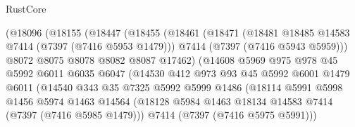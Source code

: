 \begin{lexlean}{RustCore}
\begin{coremodule}
                          (@18096
                            (@18155
                              (@18447
                                (@18455
                                  (@18461
                                    (@18471
                                      (@18481 @18485 @14583 @7414 (@7397 (@7416 @5953 @1479)))
                                      @7414
                                      (@7397 (@7416 @5943 @5959)))
                                    @8072
                                    @8075
                                    @8078
                                    @8082
                                    @8087
                                    @17462)
                                  (@14608
                                    @5969
                                    @975
                                    @978
                                    @45
                                    @5992
                                    @6011
                                    @6035
                                    @6047
                                    (@14530
                                      @412
                                      @973
                                      @93
                                      @45
                                      @5992
                                      @6001
                                      @1479
                                      @6011
                                      (@14540
                                        @343
                                        @35
                                        @7325
                                        @5992
                                        @5999
                                        @1486
                                        (@18114
                                          @5991
                                          @5998
                                          @1456
                                          @5974
                                          @1463
                                          @14564
                                          (@18128
                                            @5984
                                            @1463
                                            @18134
                                            @14583
                                            @7414
                                            (@7397 (@7416 @5985 @1479)))
                                          @7414
                                          (@7397 (@7416 @5975 @5991)))

\end{coremodule}
\end{lexlean}
